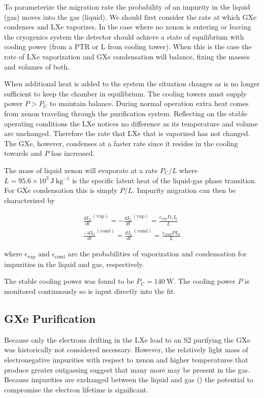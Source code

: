 To parameterize the migration rate the probability of an impurity in the liquid (gas) moves into the gas (liquid).  We should first
consider the rate at which GXe condenses and LXe vaporizes.  In the case where no xenon is entering or leaving the cryogenics system
 the detector
should achieve a state of equilibrium with cooling power \pc (from a PTR or L from cooling tower).  When this is the case the
rate of LXe vaporization and GXe condensation will balance, fixing the masses and volumes of both.

When additional heat is added to the system the situation changes as \pc is no longer sufficient to keep the chamber in
equilibrium.  The cooling towers must supply power $P > P_{\mathrm{C}}$ to maintain balance.  During normal operation extra heat comes
from xenon traveling through the purification system.  Reflecting on the stable operating conditions the LXe notices no difference as
its temperature and volume are unchanged.  Therefore the rate that LXe that is vaporized has not changed.  The GXe, however, condenses
at a faster rate since it resides in the cooling towards and $P$ has increased.

The mass of liquid xenon will evaporate at a rate $P_{\mathrm{C}} / L$ where $L = 95.6 \times 10^3\ \mathrm{J\ kg^{-1}}$ is the
specific latent heat of the liquid-gas phase transition.  For GXe condensation this is simply $P / L$.  Impurity migration can then be
characterized by

\begin{subequations}
\begin{align}
\frac{dI_{\mathrm{G}}}{dt}^{(\mathrm{vap})} = -\frac{dI_{\mathrm{L}}}{dt}^{(\mathrm{vap})} =
\frac{\epsilon_{\mathrm{vap}} P_{\mathrm{C}} I_{\mathrm{L}}}{L}
\\
\frac{-dI_{\mathrm{G}}}{dt}^{(\mathrm{cond})} = \frac{dI_{\mathrm{L}}}{dt}^{(\mathrm{cond})} =
\frac{\epsilon_{\mathrm{cond}} P I_{\mathrm{G}}}{L}
\end{align}
\end{subequations}

\noindent where $\epsilon_{\mathrm{vap}}$ and $\epsilon_{\mathrm{cond}}$ are the probabilities of vaporization and condensation for
impurities in the liquid and gas, respectively.

The stable cooling power was found to be $P_{\mathrm{C}} = 140\ \mathrm{W}$.  The cooling power $P$ is monitored continuously so is input
directly into the fit.



\subsection{GXe Purification}
\label{subsec:electron_lifetime_model_gxe}
Because only the electrons drifting in the LXe lead to an S2 purifying the GXe was historically not considered necessary.  However,
the relatively light mass of electronegative impurities with respect to xenon and higher temperatures that produce greater outgassing
suggest that many more may be present in the gas.  Because
impurities are exchanged between the liquid and gas () the potential to compromise
the electron lifetime is significant.

